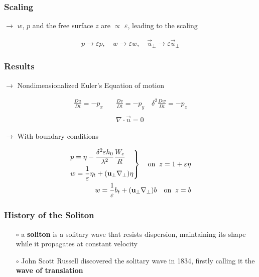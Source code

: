 \documentclass[fleqn]{beamer}
\begin{document}
    \begin{frame}
        \frametitle{Scaling}
        \centering
        $\rightarrow$ $w$, $p$ and the free surface $z$ are $\propto$
        $\varepsilon$, leading to the scaling
        \begin{ceqn}
            \begin{align}
                p \rightarrow \varepsilon p, \quad w \rightarrow \varepsilon w, \quad
                \vec{u}_\perp \rightarrow \varepsilon
                \vec{u}_\perp\nonumber
            \end{align}
        \end{ceqn}
        \end{frame}

    \begin{frame}
        \frametitle{Results}
        \centering
        $\rightarrow$ Nondimensionalized Euler's Equation of motion
        \begin{ceqn}
        \begin{align}
            \frac{Du}{Dt} = - p_x \quad
            &\frac{Dv}{Dt} = - p_y \quad
            \delta^2\frac{Dw}{Dt} = - p_z \nonumber\\
            \nonumber\\
            &\nabla \cdot \vec{u}  = 0\nonumber
        \end{align}
        \end{ceqn}
        \centering
        $\rightarrow$ With boundary conditions
        \begin{ceqn}
        \begin{align}
            \begin{drcases}
            p = \eta - \frac{\delta^2\varepsilon h_0}{\lambda^2} \frac{W_e}{R}\\
            w = \frac{1}{\varepsilon}\eta_t + (\mathbf{u}_\perp \nabla_\perp)\eta
            \end{drcases} \quad
            \text{on}\;\; z = 1+\varepsilon\eta\\
            w =\frac{1}{\varepsilon}b_t + (\mathbf{u}_\perp \nabla_\perp)b \quad
            \text{on}\;\; z=b
        \end{align}
        \end{ceqn}
    \end{frame}

    \begin{frame}
        \frametitle{History of the Soliton}
        \begin{itemize}
        \item[$\circ$] a \textbf{soliton} is a solitary wave that resists
            dispersion, maintaining its shape while it propagates at constant
            velocity\\
        \item[$\circ$] John Scott Russell discovered the solitary wave in 1834,
            firstly calling it the \textbf{wave of translation}
        \end{itemize}
    \end{frame}
\end{document}
